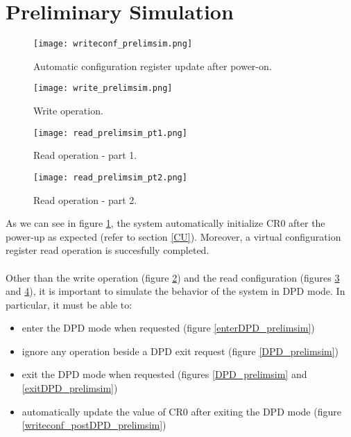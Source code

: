 \documentclass[10pt, english, a4paper, titlepage, oneside]{book}
\begin{document}
\section{Preliminary Simulation}
\begin{figure}[H]
    \centering
    \captionsetup{width=18cm}
    \texttt{[image: writeconf\_prelimsim.png]}
    \caption{\centering Automatic configuration register update after power-on.}
    \label{writeconf_prelimsim}
\end{figure}
\begin{figure}[H]
    \centering
    \captionsetup{width=18cm}
    \texttt{[image: write\_prelimsim.png]}
    \caption{\centering Write operation.}
    \label{write_prelimsim}
\end{figure}
\begin{figure}[H]
    \centering
    \captionsetup{width=18cm}
    \texttt{[image: read\_prelimsim\_pt1.png]}
    \caption{\centering Read operation - part 1.}
    \label{read_prelimsim_pt1}
\end{figure}
\begin{figure}[H]
    \centering
    \captionsetup{width=18cm}
    \texttt{[image: read\_prelimsim\_pt2.png]}
    \caption{\centering Read operation - part 2.}
    \label{read_prelimsim_pt2}
\end{figure}
\vspace{4mm}
As we can see in figure \ref{writeconf_prelimsim}, the system automatically initialize CR0 after the power-up as expected (refer to section \ref{CU}). Moreover, a virtual configuration register read operation is succesfully completed. \\ \\
Other than the write operation (figure \ref{write_prelimsim}) and the read configuration (figures \ref{read_prelimsim_pt1} and \ref{read_prelimsim_pt2}), it is important to simulate the behavior of the system in DPD mode. In particular, it must be able to:
\vspace{2mm}
\begin{itemize}
    \item enter the DPD mode when requested (figure \ref{enterDPD_prelimsim})
    \item ignore any operation beside a DPD exit request (figure \ref{DPD_prelimsim})
    \item exit the DPD mode when requested (figures \ref{DPD_prelimsim} and \ref{exitDPD_prelimsim})
    \item automatically update the value of CR0 after exiting the DPD mode (figure \ref{writeconf_postDPD_prelimsim})
\end{itemize}
\end{document}
